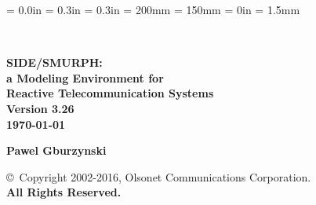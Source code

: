 \newcommand{\references}[1]{%
}%

\newenvironment{doublespace}%
{\renewcommand{\baselinestretch}{1.50} \large \normalsize}%
{\renewcommand{\baselinestretch}{1} \large \normalsize}%

\newenvironment{singlespace}%
{\renewcommand{\baselinestretch}{1} \large \normalsize}%
{\renewcommand{\baselinestretch}{1.50} \large \normalsize}%

\newcommand{\lansf}{{\sc LANSF}}
\newcommand{\smurph}{{\sc SIDE}}
\newcommand{\dsd}{{\sc DSD}}
\newcommand{\smurphtt}{{\tt SIDE}}
\newcommand{\smurphrm}{{SIDE}}
\newcommand{\smurphtts}{{\tt side}}
\newcommand{\serdel}{{\sc SERDEL}}
\newcommand{\djgpp}{{\sc DJGPP}}

\topmargin = 0.0in
\oddsidemargin = 0.3in
\evensidemargin = 0.3in
\textheight = 200mm
\textwidth = 150mm
\parindent = 0in
\parskip = 1.5mm

\sloppy



\begin{titlepage}

\vspace*{0.35in}

\begin{center}

 \\

\vspace*{0.45in}

\Huge\bf SIDE/SMURPH:\vspace{0.1in} \\

\huge\bf a Modeling Environment for\vspace{0.1in} \\

Reactive Telecommunication Systems\vspace{0.25in}\\

\Large Version 3.26 \\

\large {\today} \\

\vspace{1.1in}

\bf Pawel Gburzynski \\

\vspace*{1.5in}

{\Large {\copyright}~Copyright 2002-2016, Olsonet Communications Corporation.\\
{\bf All Rights Reserved.}}

\normalsize

\end{center}

\end{titlepage}

